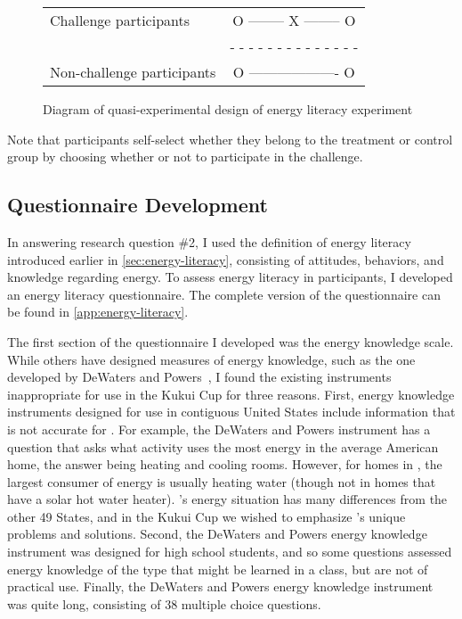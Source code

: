 \begin{figure}[htbp]
	\centering
	\begin{tabular}{l c}
		Challenge participants & O -------- X -------- O \\
		                       & - - - - - - - - - - - - - - \\
		Non-challenge participants & O ------------------- O
	\end{tabular}
	\caption{Diagram of quasi-experimental design of energy literacy experiment}
	\label{fig:literacy-exp-diagram}
\end{figure}

Note that participants self-select whether they belong to the treatment or control group by choosing whether or not to participate in the challenge.

\subsection{Questionnaire Development}
\label{sec:questionnaire-dev}

In answering research question \#2, I used the definition of energy literacy introduced earlier in \autoref{sec:energy-literacy}, consisting of attitudes, behaviors, and knowledge regarding energy. To assess energy literacy in participants, I developed an energy literacy questionnaire. The complete version of the questionnaire can be found in \autoref{app:energy-literacy}.

The first section of the questionnaire I developed was the energy knowledge scale. While others have designed measures of energy knowledge, such as the one developed by DeWaters and Powers~\cite{DeWaters2011}, I found the existing instruments inappropriate for use in the Kukui Cup for three reasons. First, energy knowledge instruments designed for use in contiguous United States include information that is not accurate for \Hawaii. For example, the DeWaters and Powers instrument has a question that asks what activity uses the most energy in the average American home, the answer being heating and cooling rooms. However, for homes in \Hawaii, the largest consumer of energy is usually heating water (though not in homes that have a solar hot water heater). \Hawaii's energy situation has many differences from the other 49 States, and in the Kukui Cup we wished to emphasize \Hawaii's unique problems and solutions. Second, the DeWaters and Powers energy knowledge instrument was designed for high school students, and so some questions assessed energy knowledge of the type that might be learned in a class, but are not of practical use. Finally, the DeWaters and Powers energy knowledge instrument was quite long, consisting of 38 multiple choice questions.

